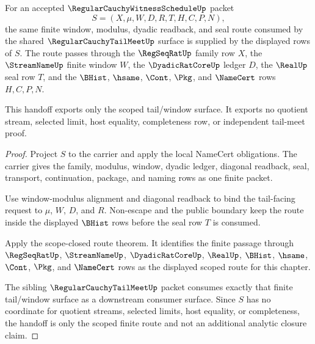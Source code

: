 \begin{theorem}
\label{thm:regular-cauchy-witness-schedule-scoped-tail-meet-handoff}
For an accepted $\RegularCauchyWitnessScheduleUp$ packet
$$
S=(X,\mu,W,D,R,T,H,C,P,N),
$$
the same finite window, modulus, dyadic readback, and seal route consumed by the shared $\RegularCauchyTailMeetUp$ surface is supplied by the displayed rows of $S$. The route passes through the $\RegSeqRatUp$ family row $X$, the $\StreamNameUp$ finite window $W$, the $\DyadicRatCoreUp$ ledger $D$, the $\RealUp$ seal row $T$, and the $\BHist$, $\hsame$, $\Cont$, $\Pkg$, and $\NameCert$ rows $H,C,P,N$.

This handoff exports only the scoped tail/window surface. It exports no quotient stream, selected limit, host equality, completeness row, or independent tail-meet proof.
\end{theorem}
\begin{proof}
Project $S$ to the carrier and apply the local NameCert obligations. The carrier gives the family, modulus, window, dyadic ledger, diagonal readback, seal, transport, continuation, package, and naming rows as one finite packet.

Use window-modulus alignment and diagonal readback to bind the tail-facing request to $\mu$, $W$, $D$, and $R$. Non-escape and the public boundary keep the route inside the displayed $\BHist$ rows before the seal row $T$ is consumed.

Apply the scope-closed route theorem. It identifies the finite passage through $\RegSeqRatUp$, $\StreamNameUp$, $\DyadicRatCoreUp$, $\RealUp$, $\BHist$, $\hsame$, $\Cont$, $\Pkg$, and $\NameCert$ rows as the displayed scoped route for this chapter.

The sibling $\RegularCauchyTailMeetUp$ packet consumes exactly that finite tail/window surface as a downstream consumer surface. Since $S$ has no coordinate for quotient streams, selected limits, host equality, or completeness, the handoff is only the scoped finite route and not an additional analytic closure claim.
\end{proof}

